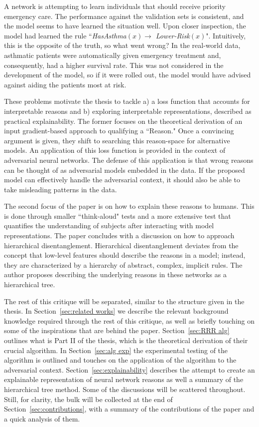 \documentclass[twoside,11pt]{article}
\begin{document}
A network is attempting to learn individuals that should receive priority emergency care. The performance against the validation sets is consistent, and the model seems to have learned the situation well. Upon closer inspection, the model had learned the rule ``\textit{HasAsthma}$(x) \rightarrow$ \textit{Lower-Risk}$(x)$". Intuitively, this is the opposite of the truth, so what went wrong? In the real-world data, asthmatic patients were automatically given emergency treatment and, consequently, had a higher survival rate. This was not considered in the development of the model, so if it were rolled out, the model would have advised against aiding the patients most at risk. 

These problems motivate the thesis to tackle a) a loss function that accounts for interpretable reasons and b) exploring interpretable representations, described as practical explainability. The former focuses on the theoretical derivation of an input gradient-based approach to qualifying a ``Reason." Once a convincing argument is given, they shift to searching this reason-space for alternative models. An application of this loss function is provided in the context of adversarial neural networks. The defense of this application is that wrong reasons can be thought of as adversarial models embedded in the data. If the proposed model can effectively handle the adversarial context, it should also be able to take misleading patterns in the data.

The second focus of the paper is on how to explain these reasons to humans. This is done through smaller ``think-aloud" tests and a more extensive test that quantifies the understanding of subjects after interacting with model representations. The paper concludes with a discussion on how to approach hierarchical disentanglement. Hierarchical disentanglement deviates from the concept that low-level features should describe the reasons in a model; instead, they are characterized by a hierarchy of abstract, complex, implicit rules. The author proposes describing the underlying reasons in these networks as a hierarchical tree. 

The rest of this critique will be separated, similar to the structure given in the thesis. In Section~\ref{sec:related works} we describe the relevant background knowledge required through the rest of this critique, as well as briefly touching on some of the inspirations that are behind the paper. Section~\ref{sec:RRR alg} outlines what is Part II of the thesis, which is the theoretical derivation of their crucial algorithm. In Section~\ref{sec:alg exp} the experimental testing of the algorithm is outlined and touches on the application of the algorithm to the adversarial context. Section~\ref{sec:explainability} describes the attempt to create an explainable representation of neural network reasons as well a summary of the hierarchical tree method. Some of the discussions will be scattered throughout. Still, for clarity, the bulk will be collected at the end of Section~\ref{sec:contributions}, with a summary of the contributions of the paper and a quick analysis of them. 
\end{document}

